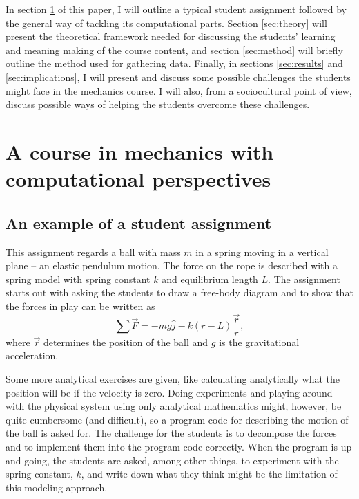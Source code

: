 \documentclass[aps,prb,floatfix,twocolumn,twoside,english]{revtex4-1}
\begin{document}
In section \ref{sec:mechanics_course} of this paper, I will outline a typical student assignment followed by the general way of tackling its computational parts. Section \ref{sec:theory} will present the theoretical framework needed for discussing the students' learning and meaning making of the course content, and section \ref{sec:method} will briefly outline the method used for gathering data. Finally, in sections \ref{sec:results} and \ref{sec:implications}, I will present and discuss some possible challenges the students might face in the mechanics course. I will also, from a sociocultural point of view, discuss possible ways of helping the students overcome these challenges.

\section{A course in mechanics with computational perspectives}
\label{sec:mechanics_course}

\subsection{An example of a student assignment}

This assignment regards a ball with mass $m$ in a spring moving in a vertical plane -- an elastic pendulum motion. The force on the rope is described with a spring model with spring constant $k$ and equilibrium length $L$. The assignment starts out with asking the students to draw a free-body diagram and to show that the forces in play can be written as
\begin{equation}
 \sum \vec F = -mg \hat j - k(r-L) \frac{\vec r}{r}, \nonumber
\end{equation}
\noindent where $\vec r$ determines the position of the ball and $g$ is the gravitational acceleration.

Some more analytical exercises are given, like calculating analytically what the position will be if the velocity is zero. Doing experiments and playing around with the physical system using only analytical mathematics might, however, be quite cumbersome (and difficult), so a program code for describing the motion of the ball is asked for. The challenge for the students is to decompose the forces and to implement them into the program code correctly. When the program is up and going, the students are asked, among other things, to experiment with the spring constant, $k$, and write down what they think might be the limitation of this modeling approach.
\end{document}
